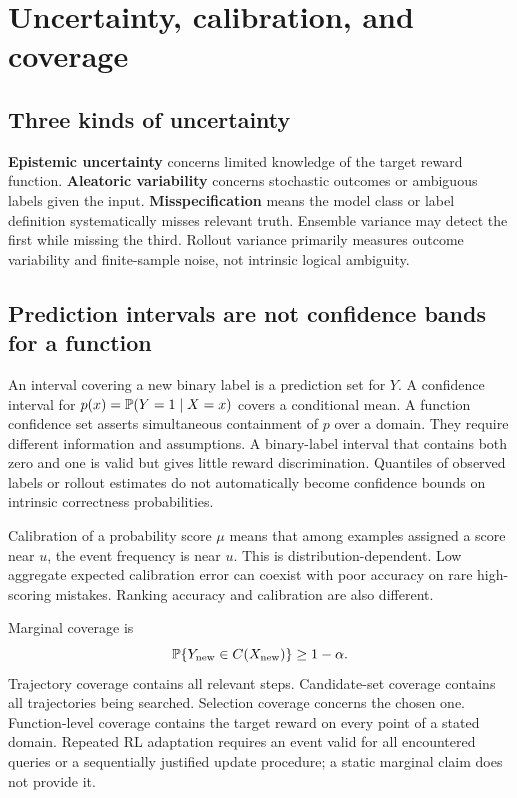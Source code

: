 \section{Uncertainty, calibration, and coverage}
\subsection{Three kinds of uncertainty}
\textbf{Epistemic uncertainty} concerns limited knowledge of the target reward
function. \textbf{Aleatoric variability} concerns stochastic outcomes or ambiguous
labels given the input. \textbf{Misspecification} means the model class or label
definition systematically misses relevant truth. Ensemble variance may detect
the first while missing the third. Rollout variance primarily measures outcome
variability and finite-sample noise, not intrinsic logical ambiguity.

\subsection{Prediction intervals are not confidence bands for a function}
An interval covering a new binary label is a prediction set for $Y$. A confidence
interval for $p(x)=\mathbb{P}(Y=1\mid X=x)$ covers a conditional mean. A function
confidence set asserts simultaneous containment of $p$ over a domain. They
require different information and assumptions. A binary-label interval that
contains both zero and one is valid but gives little reward discrimination.
Quantiles of observed labels or rollout estimates do not automatically become
confidence bounds on intrinsic correctness probabilities.

Calibration of a probability score $\mu$ means that among examples assigned a
score near $u$, the event frequency is near $u$. This is distribution-dependent.
Low aggregate expected calibration error can coexist with poor accuracy on
rare high-scoring mistakes. Ranking accuracy and calibration are also different.

Marginal coverage is
\[
 \mathbb{P}\{Y_{\rm new}\in C(X_{\rm new})\}\ge1-\alpha.
\]
Trajectory coverage contains all relevant steps. Candidate-set coverage contains
all trajectories being searched. Selection coverage concerns the chosen one.
Function-level coverage contains the target reward on every point of a stated
domain. Repeated RL adaptation requires an event valid for all encountered
queries or a sequentially justified update procedure; a static marginal claim
does not provide it.

